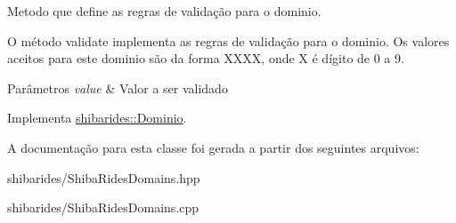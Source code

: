 Metodo que define as regras de validação para o dominio. 

O método validate implementa as regras de validação para o dominio. Os valores aceitos para este dominio são da forma X\+X\+XX, onde X é dígito de 0 a 9.


\begin{DoxyParams}{Parâmetros}
{\em value} & Valor a ser validado \\
\hline
\end{DoxyParams}


Implementa \hyperlink{classshibarides_1_1Dominio_acc9445531455c072bbf708709aebbe55}{shibarides\+::\+Dominio}.



A documentação para esta classe foi gerada a partir dos seguintes arquivos\+:\begin{DoxyCompactItemize}
\item 
shibarides/Shiba\+Rides\+Domains.\+hpp\item 
shibarides/Shiba\+Rides\+Domains.\+cpp\end{DoxyCompactItemize}
